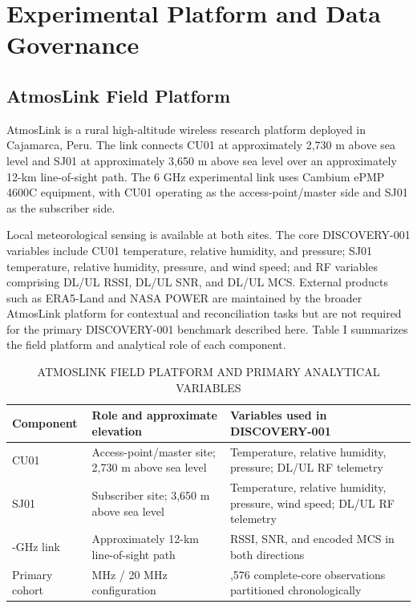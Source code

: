 \documentclass{ieeeaccess}
\begin{document}
\section{Experimental Platform and Data Governance}\label{experimental-platform-and-data-governance}

\subsection{AtmosLink Field Platform}\label{atmoslink-field-platform}

AtmosLink is a rural high-altitude wireless research platform deployed in Cajamarca, Peru. The link connects CU01 at approximately 2,730 m above sea level and SJ01 at approximately 3,650 m above sea level over an approximately 12-km line-of-sight path. The 6 GHz experimental link uses Cambium ePMP 4600C equipment, with CU01 operating as the access-point/master side and SJ01 as the subscriber side.

Local meteorological sensing is available at both sites. The core DISCOVERY-001 variables include CU01 temperature, relative humidity, and pressure; SJ01 temperature, relative humidity, pressure, and wind speed; and RF variables comprising DL/UL RSSI, DL/UL SNR, and DL/UL MCS. External products such as ERA5-Land and NASA POWER are maintained by the broader AtmosLink platform for contextual and reconciliation tasks but are not required for the primary DISCOVERY-001 benchmark described here. Table I summarizes the field platform and analytical role of each component.

\begin{table}[t]
\caption{ATMOSLINK FIELD PLATFORM AND PRIMARY ANALYTICAL VARIABLES}
\label{tab:i}
\centering
\scriptsize
\setlength{\tabcolsep}{3pt}
\renewcommand{\arraystretch}{1.15}
\begin{tabularx}{\textwidth}{>{\raggedright\arraybackslash}X >{\raggedright\arraybackslash}X >{\raggedright\arraybackslash}X}
\toprule
Component & Role and approximate elevation & Variables used in DISCOVERY-001 \\
\midrule
CU01 & Access-point/master site; 2,730 m above sea level & Temperature, relative humidity, pressure; DL/UL RF telemetry \\
SJ01 & Subscriber site; 3,650 m above sea level & Temperature, relative humidity, pressure, wind speed; DL/UL RF telemetry \\
6-GHz link & Approximately 12-km line-of-sight path & RSSI, SNR, and encoded MCS in both directions \\
Primary cohort & 7000 MHz / 20 MHz configuration & 3,576 complete-core observations partitioned chronologically \\
\bottomrule
\end{tabularx}
\end{table}
\end{document}
